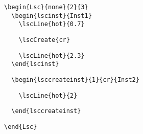 \documentclass{article}
\begin{document}
\begin{center}%
\begin{minipage}{0.435\textwidth}%
\end{minipage}%
\hfill%
\begin{minipage}{0.525\textwidth}%
\small%
{\gray%
\begin{verbatim}
\begin{Lsc}{none}{2}{3}
  \begin{lscinst}{Inst1}
    \lscLine{hot}{0.7}
\end{verbatim}}%
\verbunskip%
\begin{verbatim}
    \lscCreate{cr}
\end{verbatim}%
\verbunskip%
{\gray\begin{verbatim}
    \lscLine{hot}{2.3}
  \end{lscinst}
\end{verbatim}}%
\verbunskip%
\begin{verbatim}
  \begin{lsccreateinst}{1}{cr}{Inst2}
\end{verbatim}%
\verbunskip%
{\gray\begin{verbatim}
    \lscLine{hot}{2}
\end{verbatim}}%
\verbunskip%
\begin{verbatim}
  \end{lsccreateinst}
\end{verbatim}%
\verbunskip%
{\gray\begin{verbatim}
\end{Lsc}
\end{verbatim}}%
\end{minipage}
\end{center}%
\end{document}
